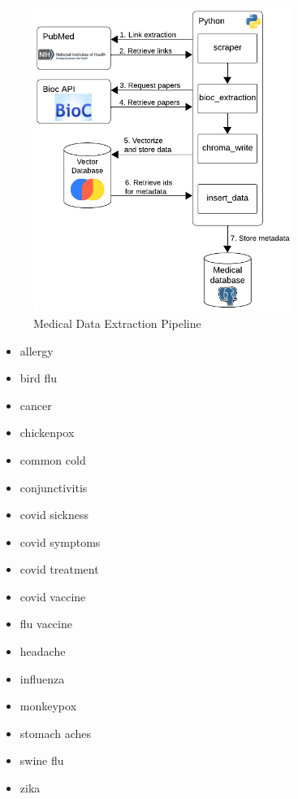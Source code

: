 \begin{figure}[!ht]
	\begin{center}
		\includegraphics[width=0.75\textwidth]{images/ETL_Pipeline.png} %
	\end{center}
	\caption{Medical Data Extraction Pipeline} %
	\label{fig:etl}
\end{figure}

\begin{multicols}{2}
	\begin{itemize}[topsep=0pt, partopsep=0pt, parsep=0pt]
	
	\item{allergy}
	\item{bird flu}
	\item{cancer}
	\item{chickenpox}
	\item{common cold}
	\item{conjunctivitis}
	\item{covid sickness}
	\item{covid symptoms}
	\item{covid treatment}
	\item{covid vaccine}
	\item{flu vaccine}
	\item{headache}
	\item{influenza}
	\item{monkeypox}
	\item{stomach aches}
	\item{swine flu}
	\item{zika}

	\end{itemize}

\end{multicols}



